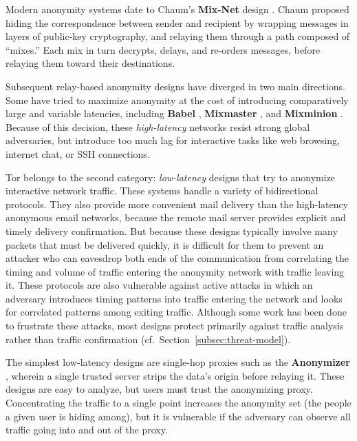 \documentclass[times,10pt,twocolumn]{article}
\begin{document}

\label{sec:related-work}

Modern anonymity systems date to Chaum's {\bf Mix-Net} design
\cite{chaum-mix}. Chaum
proposed hiding the correspondence between sender and recipient by
wrapping messages in layers of public-key cryptography, and relaying them
through a path composed of ``mixes.''  Each mix in turn
decrypts, delays, and re-orders messages, before relaying them toward
their destinations.

Subsequent relay-based anonymity designs have diverged in two
main directions.  Some have tried to maximize anonymity at
the cost of introducing comparatively large and variable latencies,
including {\bf Babel} \cite{babel}, {\bf Mixmaster}
\cite{mixmaster-spec}, and
{\bf Mixminion} \cite{minion-design}.  Because of this
decision, these \emph{high-latency} networks resist strong global
adversaries,
but introduce too much lag for interactive tasks like web browsing,
internet chat, or SSH connections.

Tor belongs to the second category: \emph{low-latency} designs that
try to anonymize interactive network traffic. These systems handle
a variety of bidirectional protocols.
They also provide more convenient
mail delivery than the high-latency anonymous email
networks, because the remote mail server provides explicit and timely
delivery confirmation.
But because these designs typically
involve many packets that must be delivered quickly, it is
difficult for them to prevent an attacker who can eavesdrop both ends of the
communication from correlating the timing and volume
of traffic entering the anonymity network with traffic leaving it.  These
protocols are also vulnerable against active attacks in which an
adversary introduces timing patterns into traffic entering the network and 
looks
for correlated patterns among exiting traffic.
Although some work has been done to frustrate
these attacks,%
 most designs protect primarily against traffic analysis rather than traffic
confirmation (cf.\ Section~\ref{subsec:threat-model}).

The simplest low-latency designs are single-hop proxies such as the
{\bf Anonymizer} \cite{anonymizer}, wherein a single trusted server strips the
data's origin before relaying it.  These designs are easy to
analyze, but users must trust the anonymizing proxy. 
Concentrating the traffic to a single point increases the anonymity set
(the people a given user is hiding among), but it is vulnerable if the
adversary can observe all traffic going into and out of the proxy.
\end{document}
